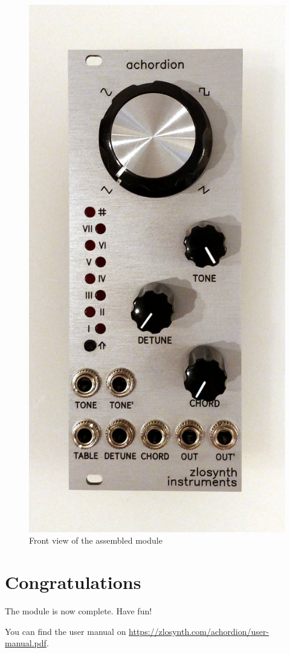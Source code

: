 \documentclass[10pt,a4paper,twocolumn]{article}
\begin{document}
\begin{figure}[p]
  \centering
  \includegraphics[width=\linewidth]{p08.jpg}
  \caption{Front view of the assembled module}
\end{figure}

\section{Congratulations}

The module is now complete. Have fun!

You can find the user manual on \url{https://zlosynth.com/achordion/user-manual.pdf}.
\end{document}
